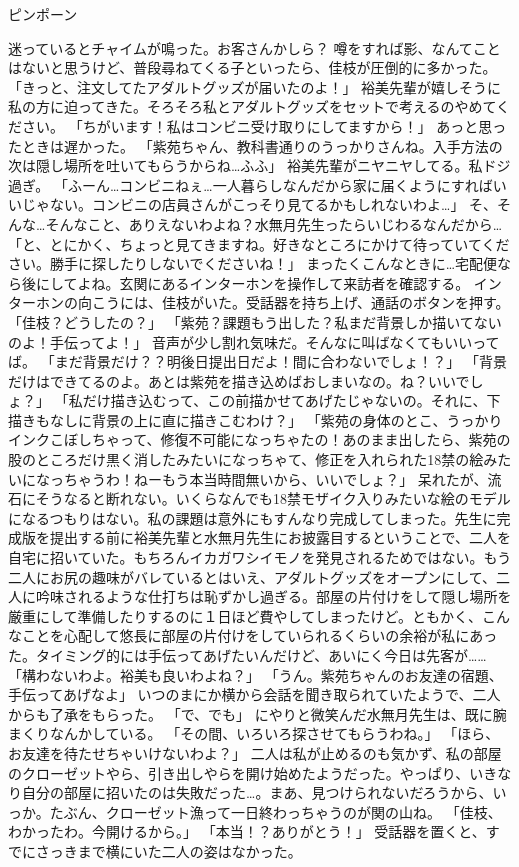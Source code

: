 ピンポーン

迷っているとチャイムが鳴った。お客さんかしら？
噂をすれば影、なんてことはないと思うけど、普段尋ねてくる子といったら、佳枝が圧倒的に多かった。
「きっと、注文してたアダルトグッズが届いたのよ！」
裕美先輩が嬉しそうに私の方に迫ってきた。そろそろ私とアダルトグッズをセットで考えるのやめてください。
「ちがいます！私はコンビニ受け取りにしてますから！」
あっと思ったときは遅かった。
「紫苑ちゃん、教科書通りのうっかりさんね。入手方法の次は隠し場所を吐いてもらうからね…ふふ」
裕美先輩がニヤニヤしてる。私ドジ過ぎ。
「ふーん…コンビニねぇ…一人暮らしなんだから家に届くようにすればいいじゃない。コンビニの店員さんがこっそり見てるかもしれないわよ…」
そ、そんな…そんなこと、ありえないわよね？水無月先生ったらいじわるなんだから…
「と、とにかく、ちょっと見てきますね。好きなところにかけて待っていてください。勝手に探したりしないでくださいね！」
まったくこんなときに…宅配便なら後にしてよね。玄関にあるインターホンを操作して来訪者を確認する。
インターホンの向こうには、佳枝がいた。受話器を持ち上げ、通話のボタンを押す。
「佳枝？どうしたの？」
「紫苑？課題もう出した？私まだ背景しか描いてないのよ！手伝ってよ！」
音声が少し割れ気味だ。そんなに叫ばなくてもいいってば。
「まだ背景だけ？？明後日提出日だよ！間に合わないでしょ！？」
「背景だけはできてるのよ。あとは紫苑を描き込めばおしまいなの。ね？いいでしょ？」
「私だけ描き込むって、この前描かせてあげたじゃないの。それに、下描きもなしに背景の上に直に描きこむわけ？」
「紫苑の身体のとこ、うっかりインクこぼしちゃって、修復不可能になっちゃたの！あのまま出したら、紫苑の股のところだけ黒く消したみたいになっちゃて、修正を入れられた18禁の絵みたいになっちゃうわ！ねーもう本当時間無いから、いいでしょ？」
呆れたが、流石にそうなると断れない。いくらなんでも18禁モザイク入りみたいな絵のモデルになるつもりはない。私の課題は意外にもすんなり完成してしまった。先生に完成版を提出する前に裕美先輩と水無月先生にお披露目するということで、二人を自宅に招いていた。もちろんイカガワシイモノを発見されるためではない。もう二人にお尻の趣味がバレているとはいえ、アダルトグッズをオープンにして、二人に吟味されるような仕打ちは恥ずかし過ぎる。部屋の片付けをして隠し場所を厳重にして準備したりするのに１日ほど費やしてしまったけど。ともかく、こんなことを心配して悠長に部屋の片付けをしていられるくらいの余裕が私にあった。タイミング的には手伝ってあげたいんだけど、あいにく今日は先客が……
「構わないわよ。裕美も良いわよね？」
「うん。紫苑ちゃんのお友達の宿題、手伝ってあげなよ」
いつのまにか横から会話を聞き取られていたようで、二人からも了承をもらった。
「で、でも」
にやりと微笑んだ水無月先生は、既に腕まくりなんかしている。
「その間、いろいろ探させてもらうわね。」
「ほら、お友達を待たせちゃいけないわよ？」
二人は私が止めるのも気かず、私の部屋のクローゼットやら、引き出しやらを開け始めたようだった。やっぱり、いきなり自分の部屋に招いたのは失敗だった…。まあ、見つけられないだろうから、いっか。たぶん、クローゼット漁って一日終わっちゃうのが関の山ね。
「佳枝、わかったわ。今開けるから。」
「本当！？ありがとう！」
受話器を置くと、すでにさっきまで横にいた二人の姿はなかった。

